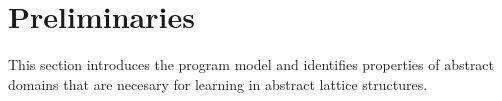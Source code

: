 \section{Preliminaries}
This section introduces the program model and identifies properties of abstract
domains that are necesary for learning in abstract lattice structures.


